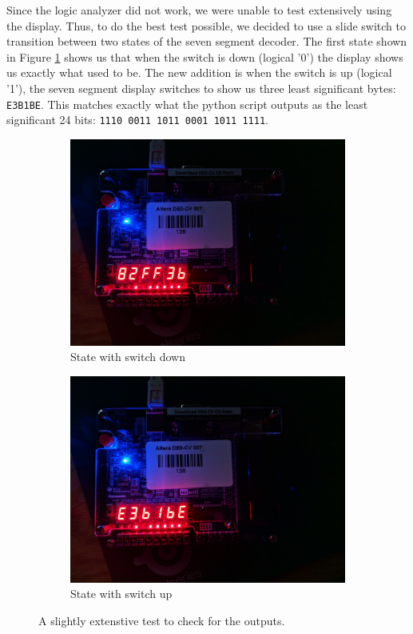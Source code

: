 \documentclass[letterpaper, 12pt]{article} %
\begin{document}
\newpage
Since the logic analyzer did not work, we were unable to test extensively using the display. Thus, to do the best test possible, we decided to use a slide switch to transition between two states of the seven segment decoder. The first state shown in Figure \ref{fpgaswd} shows us that when the switch is down (logical '0') the display shows us exactly what used to be. The new addition is when the switch is up (logical '1'), the seven segment display switches to show us three least significant bytes: \texttt{E3B1BE}.
This matches exactly what the python script outputs as the least significant 24 bits: \texttt{1110 0011 1011 0001 1011 1111}.
\begin{figure}[ht]
\centering
\begin{subfigure}{.5\textwidth}
  \centering
  \includegraphics[width=0.99\linewidth]{files/switch_down}
  \caption{State with switch down}
  \label{fpgaswd}
\end{subfigure}%
\begin{subfigure}{.5\textwidth}
  \centering
  \includegraphics[width=0.99\linewidth]{files/switch_up}
  \caption{State with switch up}
  \label{fpgaswu}
\end{subfigure}
\caption{A slightly extenstive test to check for the outputs.}
\label{fig:second}
\end{figure}
\end{document}
